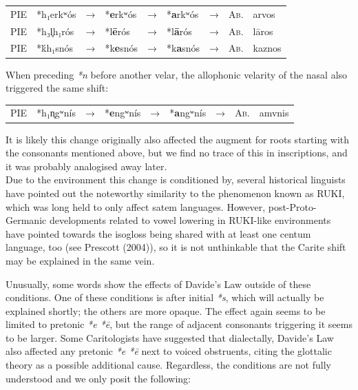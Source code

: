 \documentclass[svgnames,x11names,b5paper]{book}
\begin{document}
            \begin{table}[H]
                \begin{center}
                \begin{tabular}{llcllllll}
                \textsc{PIE} & *h₁erkʷós & → & *\textbf{e}rkʷós & → & *\textbf{a}rkʷós & → & \textsc{Ab.} & arvos\\
                \textsc{PIE} & *h₃l̥h₁rós & → & *l\textbf{ē}rós & → & *l\textbf{ā}rós & → & \textsc{Ab.} & lāros\\
                \textsc{PIE} & *ḱh₁snós & → & *k\textbf{e}snós & → & *k\textbf{a}snós & → & \textsc{Ab.} & kaznos\\
                \end{tabular}
                \end{center}
                \end{table}
        
        When preceding \textit{*n} before another velar, the allophonic velarity of the nasal also triggered the same shift:

            \begin{table}[H]
                \begin{center}
                \begin{tabular}{llcllllll}
                \textsc{PIE} & *h₁n̥gʷnís & → & *\textbf{e}ngʷnís & → & *\textbf{a}ngʷnís & → & \textsc{Ab.} & amvnis\\
                \end{tabular}
                \end{center}
                \end{table}
        
            It is likely this change originally also affected the augment for roots starting with the consonants mentioned above, but we find no trace of this in inscriptions, and it was probably analogised away later.\\
Due to the environment this change is conditioned by, several historical linguists have pointed out the noteworthy similarity to the phenomenon known as RUKI, which was long held to only affect satem languages. However, post-Proto-Germanic developments related to vowel lowering in RUKI-like environments have pointed towards the isogloss being shared with at least one centum language, too (see Prescott (2004)), so it is not unthinkable that the Carite shift may be explained in the same vein.

        Unusually, some words show the effects of Davide's Law outside of these conditions. One of these conditions is after initial \textit{*s}, which will actually be explained shortly; the others are more opaque. The effect again seems to be limited to pretonic \textit{*e *ē}, but the range of adjacent consonants triggering it seems to be larger. Some Caritologists have suggested that dialectally, Davide's Law also affected any pretonic \textit{*e *ē} next to voiced obstruents, citing the glottalic theory as a possible additional cause. Regardless, the conditions are not fully understood and we only posit the following:
\end{document}
